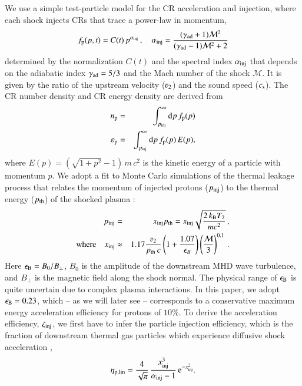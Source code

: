 \documentclass[fleqn,usenatbib,useAMS]{mnras}
\newcommand{\dd}{\mathrm{d}}
\newcommand\eb{\epsilon_\rmn{B}}
\newcommand{\p}{\rmn{p}}
\newcommand{\kB}{k_{\rmn{B}}}
\newcommand{\eps}{\varepsilon}
\begin{document}
We use a simple test-particle model for the CR acceleration and
injection, where each shock injects CRs that trace a power-law in
momentum,
\begin{equation}
  f_\p(p,t) = C(t)\,p^{\alpha_\rmn{inj}}\,,\quad
  \alpha_\rmn{inj}=\frac{(\gamma_\rmn{ad}+1)\mathcal{M}^2}
        {(\gamma_\rmn{ad}-1)\mathcal{M}^2+2}
\end{equation}
determined by the normalization $C(t)$ and the spectral index
$\alpha_{{\mathrm{inj}}}$ that depends on the adiabatic index
$\gamma_{\mathrm{ad}} = 5/3$ and the Mach number of the shock
$\mathcal{M}$. It is given by the ratio of the upstream velocity
($\varv_2$) and the sound speed ($c_{\rm s}$). The CR number density and CR
energy density are derived from
\begin{eqnarray}
n_\rmn{p} &=&
\int_{p_\rmn{inj}}^\infty \dd p\, f_\p(p)\\
\eps_\rmn{p} &=&
\int_{p_\rmn{inj}}^\infty \dd p\, f_\p(p) \,E(p),
\end{eqnarray}
where $E(p) = (\sqrt{1+p^2} -1)\, m\,c^2$ is the kinetic energy of a
particle with momentum $p$. We adopt a fit to Monte Carlo simulations
of the thermal leakage process that relates the momentum of injected
protons ($p_{\mathrm{inj}}$) to the thermal energy ($p_{\mathrm{th}}$) of the
shocked plasma \citep{kang11}:
\begin{eqnarray}
  \label{eq:qinj}
  p_\rmn{inj} &=& x_\rmn{inj} p_\rmn{th} = x_\rmn{inj} \sqrt{\frac{2 \,\kB T_2}{m c^2}}\,, \nonumber \\
  \rmn{where}\quad x_\rmn{inj} &\approx& 1.17 \frac{\varv_2}{p_{\rmn{th}}\,c} \left(1+
  \frac{1.07}{\epsilon_B}\right) \left(\frac{\mathcal{M}}{3}\right)^{0.1}\,.
\end{eqnarray}
Here $\eb = B_0/B_{\perp}$, $B_0$ is the amplitude of the downstream
MHD wave turbulence, and $B_{\perp}$ is the magnetic field along the
shock normal. The physical range of $\eb$ is quite uncertain due to
complex plasma interactions. In this paper, we adopt $\eb = 0.23$,
which -- as we will later see -- corresponds to a conservative maximum
energy acceleration efficiency for protons of $10\%$. To derive the
acceleration efficiency, $\zeta_{\mathrm{inj}}$, we first have to infer the
particle injection efficiency, which is the fraction of downstream
thermal gas particles which experience diffusive shock acceleration
\citep[for details see][]{pinzke13},
\begin{equation}
  \label{eq:eta}
  \eta_{\mathrm{p,lin}} =
  \frac{4}{\sqrt{\pi}}\,\frac{x_{\mathrm{inj}}^3}{\alpha_{\mathrm{inj}}-1}\,
  {\mathrm{e}}^{-x_{\mathrm{inj}}^2}.
\end{equation}
\end{document}
